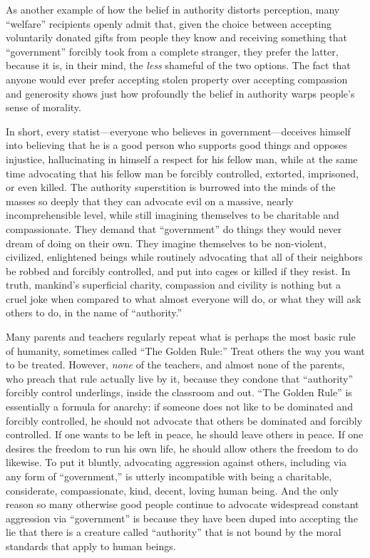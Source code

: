 \documentclass{book}
\begin{document}
As another example of how the belief in authority distorts perception, many \enquote{welfare} recipients openly admit that, given the choice between accepting voluntarily donated gifts from people they know and receiving something that \enquote{government} forcibly took from a complete stranger, they prefer the latter, because it is, in their mind, the \emph{less} shameful of the two options. The fact that anyone would ever prefer accepting stolen property over accepting compassion and generosity shows just how profoundly the belief in authority warps people's sense of morality.

In short, every statist---everyone who believes in government---deceives himself into believing that he is a good person who supports good things and opposes injustice, hallucinating in himself a respect for his fellow man, while at the same time advocating that his fellow man be forcibly controlled, extorted, imprisoned, or even killed. The authority superstition is burrowed into the minds of the masses so deeply that they can advocate evil on a massive, nearly incomprehensible level, while still imagining themselves to be charitable and compassionate. They demand that \enquote{government} do things they would never dream of doing on their own. They imagine themselves to be non-violent, civilized, enlightened beings while routinely advocating that all of their neighbors be robbed and forcibly controlled, and put into cages or killed if they resist. In truth, mankind's superficial charity, compassion and civility is nothing but a cruel joke when compared to what almost everyone will do, or what they will ask others to do, in the name of \enquote{authority.}

Many parents and teachers regularly repeat what is perhaps the most basic rule of humanity, sometimes called \enquote{The Golden Rule:} Treat others the way you want to be treated. However, \emph{none} of the teachers, and almost none of the parents, who preach that rule actually live by it, because they condone that \enquote{authority} forcibly control underlings, inside the classroom and out. \enquote{The Golden Rule} is essentially a formula for anarchy: if someone does not like to be dominated and forcibly controlled, he should not advocate that others be dominated and forcibly controlled. If one wants to be left in peace, he should leave others in peace. If one desires the freedom to run his own life, he should allow others the freedom to do likewise. To put it bluntly, advocating aggression against others, including via any form of \enquote{government,} is utterly incompatible with being a charitable, considerate, compassionate, kind, decent, loving human being. And the only reason so many otherwise good people continue to advocate widespread constant aggression via \enquote{government} is because they have been duped into accepting the lie that there is a creature called \enquote{authority} that is not bound by the moral standards that apply to human beings.
\end{document}
